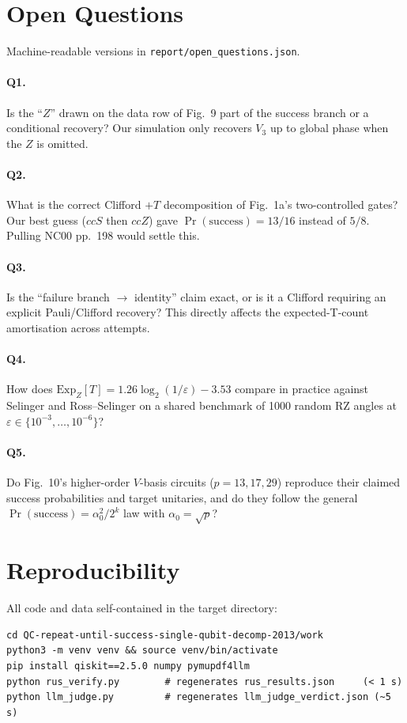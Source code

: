 \documentclass[11pt,a4paper]{article}
\newcommand{\Vthree}{V_{\!3}}
\newcommand{\Prsucc}{\Pr(\text{success})}
\begin{document}
\section{Open Questions}
\label{sec:oq}

Machine-readable versions in \texttt{report/open\_questions.json}.

\paragraph{Q1.} Is the ``$Z$'' drawn on the data row of Fig.~9 part of the
success branch or a conditional recovery?  Our simulation only recovers
$\Vthree$ up to global phase when the $Z$ is omitted.

\paragraph{Q2.} What is the correct Clifford $+ T$ decomposition of Fig.~1a's
two-controlled gates?  Our best guess ($cc\!S$ then $cc\!Z$) gave
$\Prsucc = 13/16$ instead of $5/8$.  Pulling NC00 pp.~198 would settle this.

\paragraph{Q3.} Is the ``failure branch $\to$ identity'' claim exact, or is
it a Clifford requiring an explicit Pauli/Clifford recovery?  This directly
affects the expected-T-count amortisation across attempts.

\paragraph{Q4.} How does $\mathrm{Exp}_Z[T] = 1.26 \log_2(1/\varepsilon) -
3.53$ compare in practice against Selinger and Ross--Selinger on a shared
benchmark of 1000 random RZ angles at $\varepsilon \in \{10^{-3},\dots,10^{-6}\}$?

\paragraph{Q5.} Do Fig.~10's higher-order $V$-basis circuits ($p = 13, 17, 29$)
reproduce their claimed success probabilities and target unitaries, and do
they follow the general $\Prsucc = \alpha_0^2/2^k$ law with $\alpha_0 =
\sqrt{p}$?

\section{Reproducibility}

All code and data self-contained in the target directory:
\begin{lstlisting}
cd QC-repeat-until-success-single-qubit-decomp-2013/work
python3 -m venv venv && source venv/bin/activate
pip install qiskit==2.5.0 numpy pymupdf4llm
python rus_verify.py        # regenerates rus_results.json     (< 1 s)
python llm_judge.py         # regenerates llm_judge_verdict.json (~5 s)
\end{lstlisting}
\end{document}
